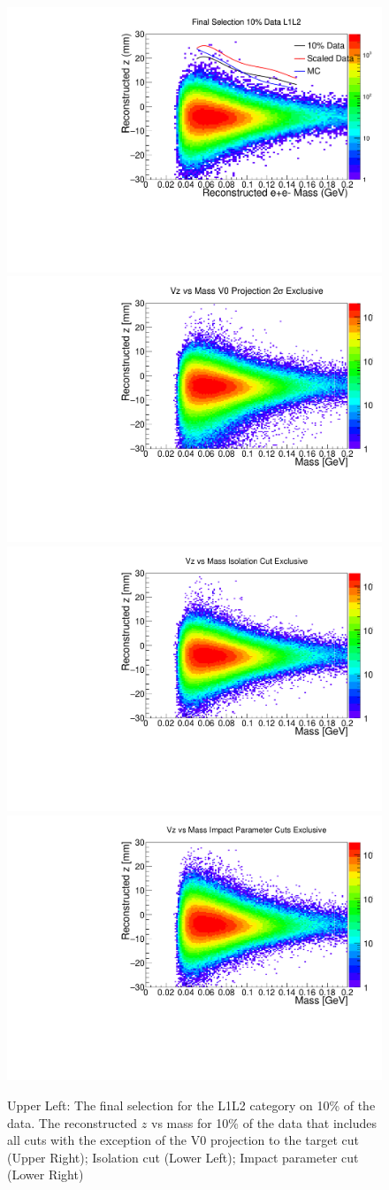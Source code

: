 \begin{figure}[t]
    \centering
    \includegraphics[width=.45\textwidth]{figs/Results/data_L1L2_final_vz_mass_zcut.pdf}
    \includegraphics[width=.45\textwidth]{figs/Results/voproj_excl_zm_L1L2.pdf}
    \includegraphics[width=.45\textwidth]{figs/Results/isocut_excl_zm_L1L2.pdf}
    \includegraphics[width=.45\textwidth]{figs/Results/ip_excl_zm_L1L2.pdf}
    \caption{Upper Left: The final selection for the L1L2 category on 10\% of the data. The reconstructed $z$ vs mass for 10\% of the data that includes  all cuts with the exception of the V0 projection to the target cut (Upper Right); Isolation cut (Lower Left); Impact parameter cut (Lower Right) %
    }
    \label{fig:n_1_full_L1L2}
\end{figure}

